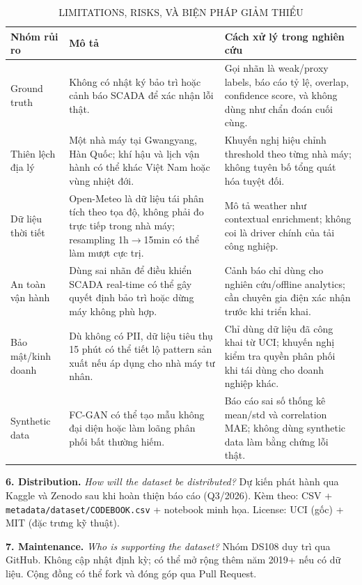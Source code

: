 \begin{table}[htbp]
\caption{LIMITATIONS, RISKS, VÀ BIỆN PHÁP GIẢM THIỂU}
\label{tab:datasheet_risks}
\centering
\small
\begin{tabular}{@{}p{2.7cm}p{5.1cm}p{5.1cm}@{}}
\toprule
Nhóm rủi ro & Mô tả & Cách xử lý trong nghiên cứu \\
\midrule
Ground truth & Không có nhật ký bảo trì hoặc cảnh báo SCADA để xác nhận lỗi thật. & Gọi nhãn là weak/proxy labels, báo cáo tỷ lệ, overlap, confidence score, và không dùng như chẩn đoán cuối cùng. \\
Thiên lệch địa lý & Một nhà máy tại Gwangyang, Hàn Quốc; khí hậu và lịch vận hành có thể khác Việt Nam hoặc vùng nhiệt đới. & Khuyến nghị hiệu chỉnh threshold theo từng nhà máy; không tuyên bố tổng quát hóa tuyệt đối. \\
Dữ liệu thời tiết & Open-Meteo là dữ liệu tái phân tích theo tọa độ, không phải đo trực tiếp trong nhà máy; resampling 1h$\rightarrow$15min có thể làm mượt cực trị. & Mô tả weather như contextual enrichment; không coi là driver chính của tải công nghiệp. \\
An toàn vận hành & Dùng sai nhãn để điều khiển SCADA real-time có thể gây quyết định bảo trì hoặc dừng máy không phù hợp. & Cảnh báo chỉ dùng cho nghiên cứu/offline analytics; cần chuyên gia điện xác nhận trước khi triển khai. \\
Bảo mật/kinh doanh & Dù không có PII, dữ liệu tiêu thụ 15 phút có thể tiết lộ pattern sản xuất nếu áp dụng cho nhà máy tư nhân. & Chỉ dùng dữ liệu đã công khai từ UCI; khuyến nghị kiểm tra quyền phân phối khi tái dùng cho doanh nghiệp khác. \\
Synthetic data & FC-GAN có thể tạo mẫu không đại diện hoặc làm loãng phân phối bất thường hiếm. & Báo cáo sai số thống kê mean/std và correlation MAE; không dùng synthetic data làm bằng chứng lỗi thật. \\
\bottomrule
\end{tabular}
\end{table}

\noindent\textbf{6. Distribution.}
\textit{How will the dataset be distributed?}
Dự kiến phát hành qua Kaggle và Zenodo sau khi hoàn thiện báo cáo (Q3/2026).
Kèm theo: CSV + \texttt{metadata/dataset/CODEBOOK.csv} + notebook minh họa.
License: UCI (gốc) + MIT (đặc trưng kỹ thuật).

\noindent\textbf{7. Maintenance.}
\textit{Who is supporting the dataset?}
Nhóm DS108 duy trì qua GitHub.
Không cập nhật định kỳ; có thể mở rộng thêm năm 2019+ nếu có dữ liệu.
Cộng đồng có thể fork và đóng góp qua Pull Request.
